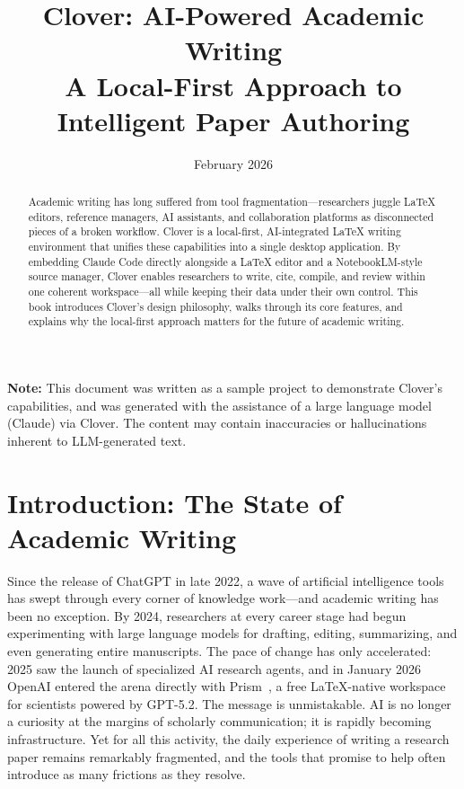 \documentclass[a4paper,11pt]{article}
\title{\textbf{Clover: AI-Powered Academic Writing}\\[0.5em]
{\large A Local-First Approach to Intelligent Paper Authoring}}
\author{}
\date{February 2026}
\begin{document}
\maketitle

\vspace{-1em}
\noindent\textbf{Note:} This document was written as a sample project to demonstrate Clover's capabilities, and was generated with the assistance of a large language model (Claude) via Clover. The content may contain inaccuracies or hallucinations inherent to LLM-generated text.
\vspace{1em}

\begin{abstract}
Academic writing has long suffered from tool fragmentation---researchers juggle LaTeX editors, reference managers, AI assistants, and collaboration platforms as disconnected pieces of a broken workflow. Clover is a local-first, AI-integrated LaTeX writing environment that unifies these capabilities into a single desktop application. By embedding Claude Code directly alongside a LaTeX editor and a NotebookLM-style source manager, Clover enables researchers to write, cite, compile, and review within one coherent workspace---all while keeping their data under their own control. This book introduces Clover's design philosophy, walks through its core features, and explains why the local-first approach matters for the future of academic writing.
\end{abstract}

\tableofcontents
\newpage

\section{Introduction: The State of Academic Writing}
\label{sec:introduction}

Since the release of ChatGPT in late 2022, a wave of artificial intelligence tools has swept through every corner of knowledge work---and academic writing has been no exception. By 2024, researchers at every career stage had begun experimenting with large language models for drafting, editing, summarizing, and even generating entire manuscripts. The pace of change has only accelerated: 2025 saw the launch of specialized AI research agents, and in January 2026 OpenAI entered the arena directly with Prism~\cite{OpenAIPrism}, a free LaTeX-native workspace for scientists powered by GPT-5.2. The message is unmistakable. AI is no longer a curiosity at the margins of scholarly communication; it is rapidly becoming infrastructure. Yet for all this activity, the daily experience of writing a research paper remains remarkably fragmented, and the tools that promise to help often introduce as many frictions as they resolve.
\end{document}
